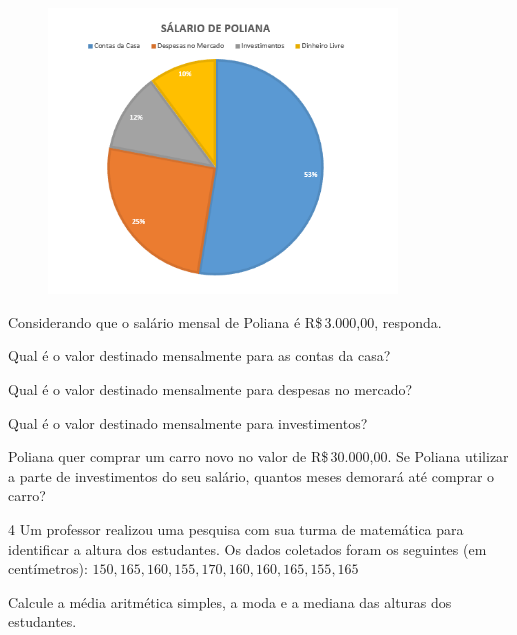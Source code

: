 {{\begin{figure}[H]
\centering\includegraphics[width=3.65in,height=2.98179in]{./imgSAEB_8_MAT/media/image41.png}
\end{figure}

Considerando que o salário mensal de Poliana é R\$\,3.000,00, responda.

\begin{escolha}[itemsep=0pt]
\item Qual é o valor destinado mensalmente para as contas da casa?
\item Qual é o valor destinado mensalmente para despesas no mercado?
\item Qual é o valor destinado mensalmente para investimentos?
\item Poliana quer comprar um carro novo no valor de R\$\,30.000,00.
Se Poliana utilizar a parte de investimentos do seu salário, quantos meses
demorará até comprar o carro?
\end{escolha}


\pagebreak

\num{4} Um professor realizou uma pesquisa com sua turma de matemática para
identificar a altura dos estudantes. Os dados coletados foram os
seguintes (em centímetros): $150, 165, 160, 155, 170, 160, 160, 165, 155, 165$ 


Calcule a média aritmética simples, a moda e a mediana das alturas dos
estudantes.

}}

